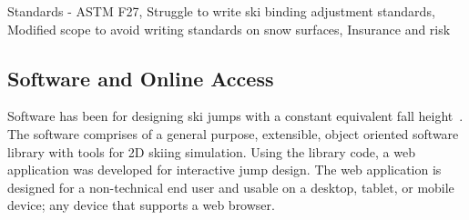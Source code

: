 \documentclass{article}
\begin{document}
Standards - ASTM F27,
Struggle to write ski binding adjustment standards,
Modified scope to avoid writing standards on snow surfaces,
Insurance and risk 

\subsection{Software and Online Access}
%
Software has been for designing ski jumps with a constant equivalent fall
height~\cite{Moore2018}. The software comprises of a general purpose,
extensible, object oriented software library with tools for 2D skiing
simulation. Using the library code, a web application was developed for
interactive jump design. The web application is designed for a non-technical
end user and usable on a desktop, tablet, or mobile device; any device that
supports a web browser.
\end{document}
